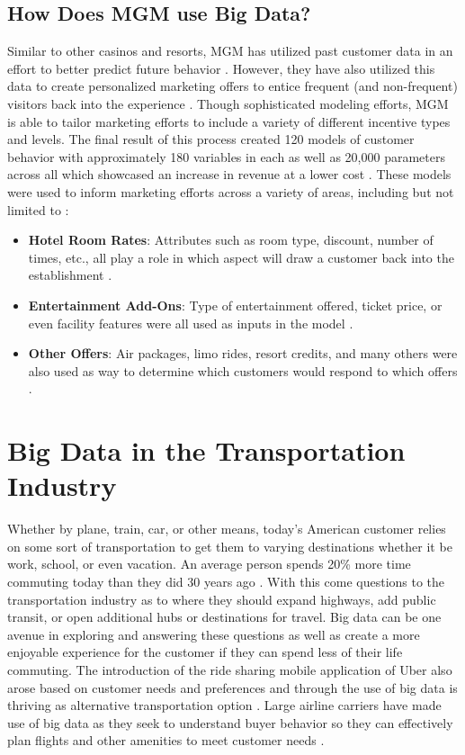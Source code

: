 \documentclass[sigconf]{acmart}
\begin{document}
\subsection{How Does MGM use Big Data?}
Similar to other casinos and resorts, MGM has utilized past customer data in an effort to better predict future behavior \cite{Nair2016}. However, they have also utilized this data to create personalized marketing offers to entice frequent (and non-frequent) visitors back into the experience \cite{Nair2016}. Though sophisticated modeling efforts, MGM is able to tailor marketing efforts to include a variety of different incentive types and levels. The final result of this process created 120 models of customer behavior with approximately 180 variables in each as well as 20,000 parameters across all which showcased an increase in revenue at a lower cost \cite{Nair2016}. These models were used to inform marketing efforts across a variety of areas, including but not limited to \cite{Nair2016}: 

\begin{itemize}
 \item \textbf{Hotel Room Rates}: Attributes such as room type, discount, number of times, etc., all play a role in which aspect will draw a customer back into the establishment \cite{Nair2016}.  
 \item \textbf{Entertainment Add-Ons}: Type of entertainment offered, ticket price, or even facility features were all used as inputs in the model \cite{Nair2016}. 
\item \textbf{Other Offers}: Air packages, limo rides, resort credits, and many others were also used as way to determine which customers would respond to which offers \cite{Nair2016}. 
\end{itemize}

\section{Big Data in the Transportation Industry}
Whether by plane, train, car, or other means, today's American customer relies on some sort of transportation to get them to varying destinations whether it be work, school, or even vacation. An average person spends 20\% more time commuting today than they did 30 years ago \cite{Clifford2017}. With this come questions to the transportation industry as to where they should expand highways, add public transit, or open additional hubs or destinations for travel. Big data can be one avenue in exploring and answering these questions as well as create a more enjoyable experience for the customer if they can spend less of their life commuting. The introduction of the ride sharing mobile application of Uber also arose based on customer needs and preferences and through the use of big data is thriving as alternative transportation option \cite{Cohen2016}. Large airline carriers have made use of big data as they seek to understand buyer behavior so they can effectively plan flights and other amenities to meet customer needs \cite{Noyes2014}. 
\end{document}
